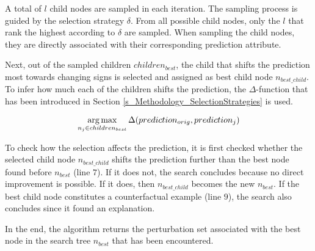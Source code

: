 A total of $l$ child nodes are sampled in each iteration. The sampling process is guided by the selection strategy $\delta$. From all possible child nodes, only the $l$ that rank the highest according to $\delta$ are sampled. When sampling the child nodes, they are directly associated with their corresponding prediction attribute. 

Next, out of the sampled children $children_{best}$, the child that shifts the prediction most towards changing signs is selected and assigned as best child node $n_{best\_child}$. To infer how much each of the children shifts the prediction, the $\Delta$-function that has been introduced in Section \ref{s_Methodology_SelectionStrategies} is used. 

\begin{equation}
    \operatorname*{arg\,max}_{n_j \in children_{best}} \Delta(prediction_{orig}, prediction_j)
\end{equation}

To check how the selection affects the prediction, it is first checked whether the selected child node $n_{best\_child}$ shifts the prediction further than the best node found before $n_{best}$ (line $7$). If it does not, the search concludes because no direct improvement is possible. If it does, then $n_{best\_child}$ becomes the new $n_{best}$. If the best child node constitutes a counterfactual example (line $9$), the search also concludes since it found an explanation.

In the end, the algorithm returns the perturbation set associated with the best node in the search tree $n_{best}$ that has been encountered.


